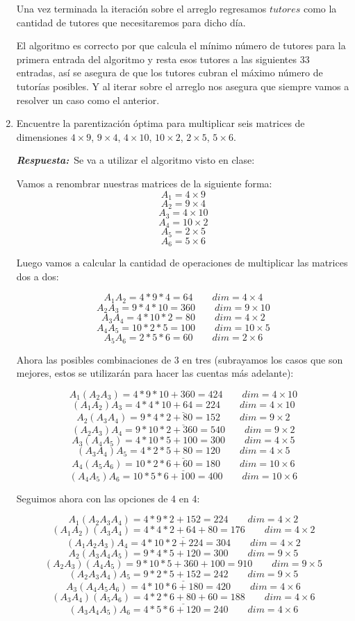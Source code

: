 \documentclass[11pt,letterpaper]{article}
\newcommand\respuesta{\textbf{\textit{Respuesta:}}}
\begin{document}
\begin{enumerate}[leftmargin=*]
    Una vez terminada la iteración sobre el arreglo regresamos $tutores$ como la cantidad de tutores que necesitaremos para dicho día.

    El algoritmo es correcto por que calcula el mínimo número de tutores para la primera entrada del algoritmo y resta esos tutores a las siguientes 33 entradas, así se asegura de que los tutores cubran el máximo número de tutorías posibles. Y al iterar sobre el arreglo nos asegura que siempre vamos a resolver un caso como el anterior.
    
    \item Encuentre la parentización óptima para multiplicar seis matrices de dimensiones $4\times9$, $9\times4$, $4\times10$, $10\times2$, $2\times5$, $5\times6$.

    \respuesta\ Se va a utilizar el algoritmo visto en clase:

    Vamos a renombrar nuestras matrices de la siguiente forma:
    \[ A_1 = 4 \times 9 \]
    \[ A_2 = 9 \times 4 \]
    \[ A_3 = 4 \times 10 \]
    \[ A_4 = 10 \times 2 \]
    \[ A_5 = 2 \times 5 \]
    \[ A_6 = 5 \times 6 \]

    Luego vamos a calcular la cantidad de operaciones de multiplicar las matrices dos a dos:
    
    \[ A_1A_2 = 4 * 9 * 4 = 64 \qquad dim = 4 \times 4 \]
    \[ A_2A_3 = 9 * 4 * 10 = 360 \qquad dim = 9 \times 10 \]
    \[ A_3A_4 = 4 * 10 * 2 = 80 \qquad dim = 4 \times 2 \]
    \[ A_4A_5 = 10 * 2 * 5 = 100 \qquad dim = 10 \times 5 \]
    \[ A_5A_6 = 2 * 5 * 6 = 60 \qquad dim = 2 \times 6 \]

    Ahora las posibles combinaciones de 3 en tres (subrayamos los casos que son mejores, estos se utilizarán para hacer las cuentas más adelante):

    \[ A_1(A_2A_3) = 4 * 9 * 10 + 360 = 424 \qquad dim = 4 \times 10 \]
    \[ \underline{(A_1A_2)A_3 = 4 * 4 * 10 + 64 = 224 \qquad dim = 4 \times 10} \]
    \[ \underline{A_2(A_3A_4) = 9 * 4 * 2 + 80 = 152 \qquad dim = 9 \times 2} \]
    \[ (A_2A_3)A_4 = 9 * 10 * 2 + 360 = 540 \qquad dim = 9 \times 2 \]
    \[ A_3(A_4A_5) = 4 * 10 * 5 + 100 = 300 \qquad dim = 4 \times 5 \]
    \[ \underline{(A_3A_4)A_5 = 4 * 2 * 5 + 80 = 120 \qquad dim = 4 \times 5} \]
    \[ \underline{A_4(A_5A_6) = 10 * 2 * 6 + 60 = 180 \qquad dim = 10 \times 6} \]
    \[ (A_4A_5)A_6 = 10 * 5 * 6 + 100 = 400 \qquad dim = 10 \times 6 \]
    
    Seguimos ahora con las opciones de 4 en 4:

    \[ A_1(A_2A_3A_4) = 4*9*2+152 = 224 \qquad dim = 4\times2 \]
    \[ \underline{(A_1A_2)(A_3A_4) = 4*4*2+64+80 = 176 \qquad dim = 4\times2} \]
    \[ (A_1A_2A_3)A_4 = 4*10*2+224 = 304 \qquad dim = 4\times2 \]
    \[ A_2(A_3A_4A_5) = 9*4*5+120 = 300 \qquad dim = 9\times5 \]
    \[ (A_2A_3)(A_4A_5) = 9*10*5+360+100 = 910 \qquad dim = 9\times5 \]
    \[ \underline{(A_2A_3A_4)A_5 = 9*2*5+152 = 242 \qquad dim = 9\times5} \]
    \[ A_3(A_4A_5A_6) = 4*10*6+180 = 420 \qquad dim = 4\times6 \]
    \[ \underline{(A_3A_4)(A_5A_6) = 4*2*6+80+60 = 188 \qquad dim = 4\times6} \]
    \[ (A_3A_4A_5)A_6 = 4*5*6+120 = 240 \qquad dim = 4\times6 \]


\end{enumerate}
\end{document}
